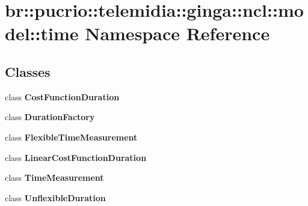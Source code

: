 \section{br::pucrio::telemidia::ginga::ncl::model::time Namespace Reference}
\label{namespacebr_1_1pucrio_1_1telemidia_1_1ginga_1_1ncl_1_1model_1_1time}


\subsection*{Classes}
\begin{CompactItemize}
\item 
class {\bf CostFunctionDuration}
\item 
class {\bf DurationFactory}
\item 
class {\bf FlexibleTimeMeasurement}
\item 
class {\bf LinearCostFunctionDuration}
\item 
class {\bf TimeMeasurement}
\item 
class {\bf UnflexibleDuration}
\end{CompactItemize}
